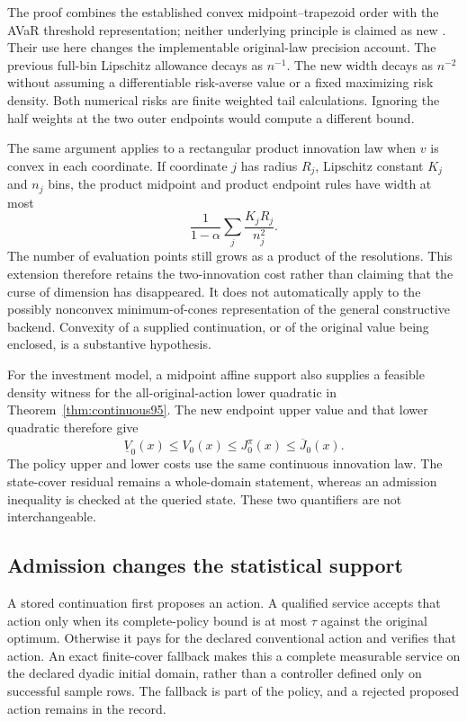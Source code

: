 The proof combines the established convex midpoint--trapezoid order with the AVaR threshold representation; neither underlying principle is claimed as new \citep{alomari2016hermite,RockafellarUryasev2000}. Their use here changes the implementable original-law precision account. The previous full-bin Lipschitz allowance decays as $n^{-1}$. The new width decays as $n^{-2}$ without assuming a differentiable risk-averse value or a fixed maximizing risk density. Both numerical risks are finite weighted tail calculations. Ignoring the half weights at the two outer endpoints would compute a different bound.



The same argument applies to a rectangular product innovation law when $v$ is convex in each coordinate. If coordinate $j$ has radius $R_j$, Lipschitz constant $K_j$ and $n_j$ bins, the product midpoint and product endpoint rules have width at most
\[
 \frac{1}{1-\alpha}\sum_j\frac{K_jR_j}{n_j^2}.
\]
The number of evaluation points still grows as a product of the resolutions. This extension therefore retains the two-innovation cost rather than claiming that the curse of dimension has disappeared. It does not automatically apply to the possibly nonconvex minimum-of-cones representation of the general constructive backend. Convexity of a supplied continuation, or of the original value being enclosed, is a substantive hypothesis.

For the investment model, a midpoint affine support also supplies a feasible density witness for the all-original-action lower quadratic in Theorem~\ref{thm:continuous95}. The new endpoint upper value and that lower quadratic therefore give
\[
 \underline V_0(x)\leq V_0(x)\leq J_0^{\widehat\pi}(x)
                   \leq\overline J_0(x).
\]
The policy upper and lower costs use the same continuous innovation law. The state-cover residual remains a whole-domain statement, whereas an admission inequality is checked at the queried state. These two quantifiers are not interchangeable.

\subsection{Admission changes the statistical support}
A stored continuation first proposes an action. A qualified service accepts that action only when its complete-policy bound is at most $\tau$ against the original optimum. Otherwise it pays for the declared conventional action and verifies that action. An exact finite-cover fallback makes this a complete measurable service on the declared dyadic initial domain, rather than a controller defined only on successful sample rows. The fallback is part of the policy, and a rejected proposed action remains in the record.

